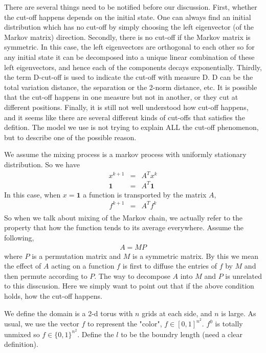 There are several things need to be notified before our discussion. First, whether the cut-off happens depends on the initial state. One can always find an initial distribution which has no cut-off by simply choosing the left eigenvector (of the Markov matrix) direction. Secondly, there is no cut-off if the Markov matrix is symmetric. In this case, the left eigenvectors are orthogonal to each other so for any initial state it can be decomposed into a unique linear combination of these left eigenvectors, and hence each of the components decays exponentially. Thirdly, the term D-cut-off is used to indicate the cut-off with measure D. D can be the total variation distance, the separation or the 2-norm distance, etc. It is possible that the cut-off happens in one measure but not in another, or they cut at different positions. Finally, it is still not well understood how cut-off happens, and it seems like there are several different kinds of cut-offs that satisfies the defition. The model we use is not trying to explain ALL the cut-off phenomenon, but to describe one of the possible reason.    

We assume the mixing process is a markov process with uniformly stationary distribution. So we have
\begin{eqnarray*}
  x^{k+1} &=& A^{T}x^{k}\\
  \mathbf{1} &=& A^{T}\mathbf{1}
\end{eqnarray*}
In this case, when $x = \mathbf{1}$ a function is transported by the matrix $A$, 
\begin{eqnarray*}
  f^{k+1} &=& A^{T}f^{k}\\
\end{eqnarray*}
So when we talk about mixing of the Markov chain, we actually refer to the property that how the function tends to its average everywhere. Assume the following, 
 \begin{eqnarray*}
  A = MP
\end{eqnarray*}  
where $P$ is a permutation matrix and $M$ is a symmetric matrix. By this we mean the effect of $A$ acting on a function $f$ is first to diffuse the entries of $f$ by $M$ and then permute according to $P$. The way to decompose $A$ into $M$ and $P$ is unrelated to this disscusion. Here we simply want to point out that if the above condition holds, how the cut-off happens.   

We define the domain is a 2-d torus with $n$ grids at each side, and $n$ is large. As usual, we use the vector $f$ to represent the "color", $f \in [0 ,1]^{n^2} $. $f^0$ is totally unmixed so $f \in \{0 ,1\}^{n^2}$. Define the $l$ to be the boundry length (need a clear definition). 

